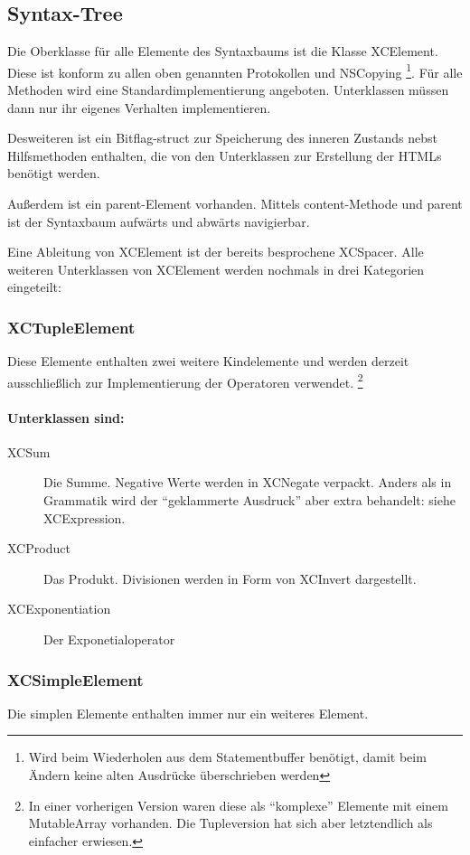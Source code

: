 \subsection{Syntax-Tree}
Die Oberklasse für alle Elemente des Syntaxbaums ist die Klasse XCElement.
Diese ist konform zu allen oben genannten Protokollen und NSCopying 
\footnote{Wird beim Wiederholen aus dem Statementbuffer benötigt, damit beim Ändern keine alten Ausdrücke überschrieben werden}. 
Für alle Methoden wird eine Standardimplementierung angeboten. 
Unterklassen müssen dann nur ihr eigenes Verhalten implementieren.


Desweiteren ist ein Bitflag-struct zur Speicherung des inneren Zustands nebst Hilfsmethoden enthalten, die von den Unterklassen zur Erstellung der HTMLs benötigt werden.


Außerdem ist ein parent-Element vorhanden. 
Mittels content-Methode und parent ist der Syntaxbaum aufwärts und abwärts navigierbar.

Eine Ableitung von XCElement ist der bereits besprochene XCSpacer.
Alle weiteren Unterklassen von XCElement werden nochmals in drei Kategorien eingeteilt:

\subsubsection{XCTupleElement}
Diese Elemente enthalten zwei weitere Kindelemente und werden derzeit ausschließlich zur Implementierung der Operatoren verwendet.
\footnote{
	In einer vorherigen Version waren diese als ``komplexe'' Elemente mit einem MutableArray vorhanden. Die Tupleversion hat sich aber letztendlich als einfacher erwiesen.
}

\paragraph{Unterklassen sind:} 
\begin{description}
	\item[XCSum] Die Summe. Negative Werte werden in XCNegate verpackt.
		Anders als in Grammatik wird der ``geklammerte Ausdruck'' aber extra behandelt: siehe XCExpression.
	\item[XCProduct] Das Produkt. Divisionen werden in Form von XCInvert dargestellt.
	\item[XCExponentiation] Der Exponetialoperator
\end{description}

\subsubsection{XCSimpleElement}
Die simplen Elemente enthalten immer nur ein weiteres Element.
